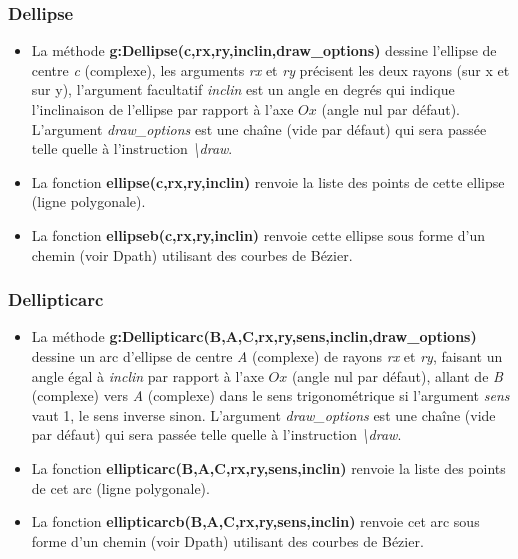 \subsubsection{Dellipse}
\begin{itemize}
    \item  La méthode \textbf{g:Dellipse(c,rx,ry,inclin,draw\_options)} dessine l'ellipse de centre \emph{c} (complexe), les arguments \emph{rx} et \emph{ry} précisent les deux rayons (sur x et sur y), l'argument facultatif \emph{inclin} est un angle en degrés qui indique l'inclinaison de l'ellipse par rapport à l'axe \(Ox\) (angle nul par défaut). L'argument \emph{draw\_options} est une chaîne (vide par défaut) qui sera passée telle quelle à l'instruction \emph{\textbackslash draw}.
  \item La fonction \textbf{ellipse(c,rx,ry,inclin)} renvoie la liste des points de cette ellipse (ligne polygonale). 
  \item La fonction \textbf{ellipseb(c,rx,ry,inclin)} renvoie cette ellipse sous forme d'un chemin (voir Dpath) utilisant des courbes de Bézier.
\end{itemize}

\subsubsection{Dellipticarc}
\begin{itemize}
    \item La méthode \textbf{g:Dellipticarc(B,A,C,rx,ry,sens,inclin,draw\_options)} dessine un arc d'ellipse de centre \emph{A} (complexe) de rayons \emph{rx} et \emph{ry}, faisant un angle égal à \emph{inclin} par rapport à l'axe \(Ox\) (angle nul par défaut), allant de \emph{B} (complexe) vers \emph{A} (complexe) dans le sens trigonométrique si l'argument \emph{sens} vaut 1, le sens inverse sinon. L'argument \emph{draw\_options} est une chaîne (vide par défaut) qui sera passée telle quelle à l'instruction \emph{\textbackslash draw}.
    \item La fonction \textbf{ellipticarc(B,A,C,rx,ry,sens,inclin)} renvoie la liste des points de cet arc (ligne polygonale). 
    \item La fonction \textbf{ellipticarcb(B,A,C,rx,ry,sens,inclin)} renvoie cet arc sous forme d'un chemin (voir Dpath) utilisant des courbes de Bézier.
\end{itemize}

